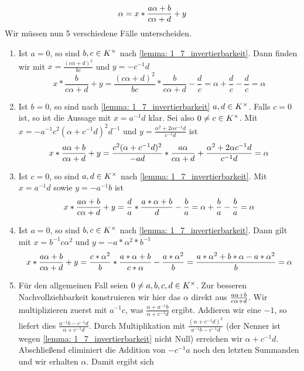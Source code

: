 \begin{exercisePage}
\begin{itemize}[leftmargin=*]
        \begin{equation*}
            \alpha = x * \frac{a \alpha + b}{c \alpha + d} + y
        \end{equation*}
        Wir müssen nun 5 verschiedene Fälle unterscheiden.
        \begin{enumerate}[leftmargin=*, label=(\roman*)]
            \item Ist $a = 0$, so sind $b,c \in {K}^{\times}$ nach \cref{lemma: 1_7_invertierbarkeit}. Dann finden wir mit $x = \frac{(c \alpha + d)^2}{bc}$ und $y = -c^{-1}d$
            \begin{equation*}
                x * \frac{b}{c \alpha + d} + y = \frac{(c \alpha + d)^2}{bc} * \frac{b}{c \alpha + d} - \frac{d}{c}
                = \alpha + \frac{d}{c} - \frac{d}{c} = \alpha
            \end{equation*}
            \item Ist $b = 0$, so sind nach \cref{lemma: 1_7_invertierbarkeit} $a,d \in {K}^{\times}$. Falls $c = 0$ ist, so ist die Aussage mit $x = a^{-1}d$ klar. Sei also $0 \neq c \in {K}^{\times}$. Mit $x = -a^{-1} c^2 (\alpha + c^{-1}d)^2 d^{-1}$ und $y = \frac{\alpha^2 + 2 \alpha c^{-1} d}{c^{-1} d}$ ist 
            \begin{equation*}
                x * \frac{a \alpha + b}{c \alpha + d} + y 
                = \frac{c^2 (\alpha + c^{-1}d)^2}{-ad} * \frac{a \alpha}{c\alpha + d} + \frac{\alpha^2 + 2\alpha c^{-1} d}{c^{-1} d} = \alpha
            \end{equation*}
            \item Ist $c = 0$, so sind $a,d \in {K}^{\times}$ nach \cref{lemma: 1_7_invertierbarkeit}. Mit $x = a^{-1} d$ sowie $y = -a^{-1} b  $ ist
            \begin{equation*}
            x * \frac{a \alpha + b}{c \alpha + d} + y = \frac{d}{a} * \frac{a * \alpha + b}{d} - \frac{b}{a} = \alpha + \frac{b}{a} - \frac{b}{a} = \alpha
            \end{equation*}
            \item Ist $a = 0$, so sind $b,c \in {K}^{\times}$ nach \cref{lemma: 1_7_invertierbarkeit}. Dann gilt mit $x = b^{-1} c \alpha^2$ und $y = -a*\alpha^2*b^{-1}$
            \begin{equation*}
                x * \frac{a \alpha + b}{c \alpha + d} + y 
                = \frac{c * \alpha^2}{b} * \frac{a*\alpha + b}{c * \alpha} - \frac{a*\alpha^2}{b} 
                = \frac{a*\alpha^2 + b * \alpha - a*\alpha^2}{b} 
                = \alpha
            \end{equation*}
            \item Für den allgemeinen Fall seien $0 \neq a,b,c,d \in {K}^{\times}$. Zur besseren Nachvollziehbarkeit konstruieren wir hier das $\alpha$ direkt aus $\frac{a \alpha + b}{c \alpha + d}$. Wir multiplizieren zuerst mit $a^{-1}c$, was $\frac{\alpha + a^{-1}b}{\alpha + c^{-1}d}$ ergibt. Addieren wir eine $-1$, so liefert dies $\frac{a^{-1}b - c^{-1} d}{\alpha + c^{-1} d}$. Durch Multiplikation mit $\frac{(\alpha + c^{-1}d)^2}{a^{-1}b - c^{-1}d}$ (der Nenner ist wegen \cref{lemma: 1_7_invertierbarkeit} nicht Null) erreichen wir $\alpha + c^{-1}d$. Abschließend eliminiert die Addition von $-c^{-1}a$ noch den letzten Summanden und wir erhalten $\alpha$. Damit ergibt sich

\end{enumerate}
\end{itemize}
\end{exercisePage}
